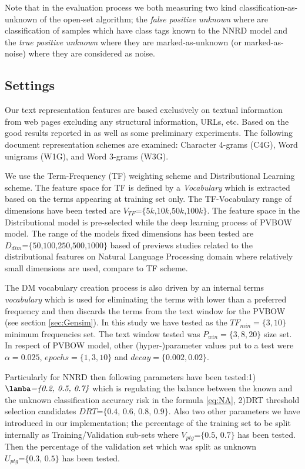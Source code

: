 Note that in the evaluation process we both measuring two kind classification-as-unknown of the open-set algorithm; the \textit{false positive unknown} where are classification of samples which have class tags known to the NNRD model and the \textit{true positive unknown} where they are marked-as-unknown (or marked-as-noise) where they are considered as noise.

\subsection{Settings}\label{sec:evaluation_measures}
Our text representation features are based exclusively on textual information from web pages excluding any structural information, URLs, etc. Based on the good results reported in \citep{sharoff2010web,pritsos2013open,Asheghi2015} as well as some preliminary experiments. The following document representation schemes are examined: Character 4-grams (C4G), Word unigrams (W1G), and Word 3-grams (W3G).

We use the Term-Frequency (TF) weighting scheme and Distributional Learning scheme. The feature space for TF is defined by a \textit{Vocabulary} which is extracted based on the terms appearing at training set only. The TF-Vocabulary range of dimensions have been tested are $V_{TF}\textit{=\{5k,10k,50k,100k\}}$. The feature space in the Distributional model is pre-selected while the deep learning process of PVBOW model. The range of the models fixed dimensions has been tested are $D_{dim}\textit{=\{50,100,250,500,1000\}}$ based of previews studies related to the distributional features on Natural Language Processing domain where relatively small dimensions are used, compare to TF scheme.

The DM vocabulary creation process is also driven by an internal terms \textit{vocabulary} which is used for eliminating the terms with lower than a preferred frequency and then discards the terms from the text window for the PVBOW (see section \ref{sec:Gensim}). In this study we have tested as the $TF_{min}=\{3,10\}$ minimum frequencies set. The text window tested was $P_{win}=\{3,8,20\}$ size set. In respect of PVBOW model, other (hyper-)parameter values put to a test were $\alpha=0.025$, $epochs=\{1, 3, 10\}$ and $decay=\{0.002, 0.02\}$.

Particularly for NNRD then following parameters have been tested:1) $\lamba\textit{=\{0.2, 0.5, 0.7\}}$ which is regulating the balance between the known and the unknown classification accuracy risk in the formula \ref{eq:NA}, 2)DRT threshold selection candidates $DRT\textit{=\{0.4, 0.6, 0.8, 0.9\}}$. Also two other parameters we have introduced in our implementation; the percentage of the training set to be split internally as Training/Validation sub-sets where $V_{ptg}\textit{=\{0.5, 0.7\}}$ has been tested. Then the percentage of the validation set which was split as unknown $U_{ptg}\textit{=\{0.3, 0.5\}}$ has been tested.

